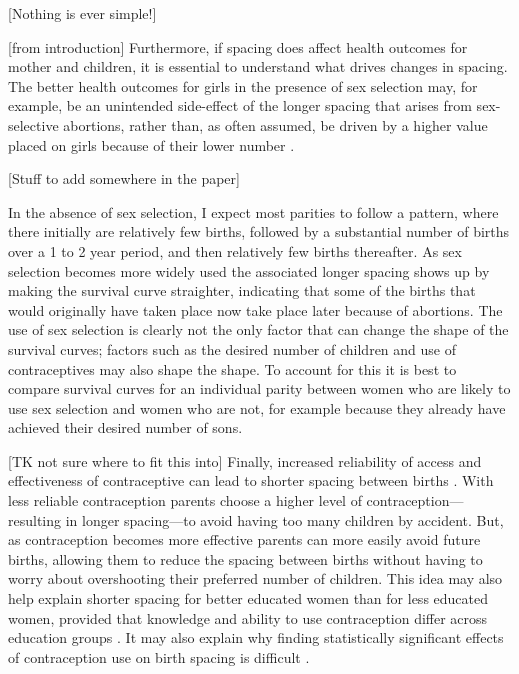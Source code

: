 \documentclass[12pt,letterpaper]{article}
\begin{document}
[Nothing is ever simple!]

[from introduction]
Furthermore, if spacing does affect health outcomes for mother and children, it is 
essential to understand what drives changes in spacing.
The better health outcomes for girls in the presence of sex selection may,
for example, be an unintended side-effect of the longer spacing that arises
from sex-selective abortions, rather than, as often assumed, be driven by a 
higher value placed on girls because of their lower number \citep{Lin2014,Hu2015}.




[Stuff to add somewhere in the paper]

In the absence of sex selection, I expect most parities to follow
a pattern, where there initially are relatively few births, 
followed by a substantial number of births over a 1 to 2 year period, and then
relatively few births thereafter.
As sex selection becomes more widely used the associated
longer spacing shows up by making the survival curve straighter,
indicating that some of the births that would originally have taken place
now take place later because of abortions.
The use of sex selection is clearly not the only factor that can change the shape of
the survival curves; factors such as the desired number of children and
use of contraceptives may also shape the shape.
To account for this it is best to compare survival curves for an individual
parity between women who are likely to use sex selection and women who are
not, for example because they already have achieved their desired 
number of sons.



[TK not sure where to fit this into]
Finally, increased reliability of access and effectiveness of
contraceptive can lead to shorter spacing between births 
\citep{Keyfitz1971,Heckman1976}.
With less reliable contraception parents choose a higher level 
of contraception---resulting in longer spacing---to avoid having 
too many children by accident.
But, as contraception becomes more effective parents can more
easily avoid future births, allowing them to reduce the spacing 
between births without having to worry about overshooting their 
preferred number of children.
This idea may also help explain shorter spacing for better 
educated women than for less educated women, provided that   
knowledge and ability to use contraception differ
across education groups \citep{Tulasidhar1993,Whitworth2002}.
It may also explain why finding statistically significant
effects of contraception use on birth spacing is difficult \citep{Yeakey2009}.
\end{document}

